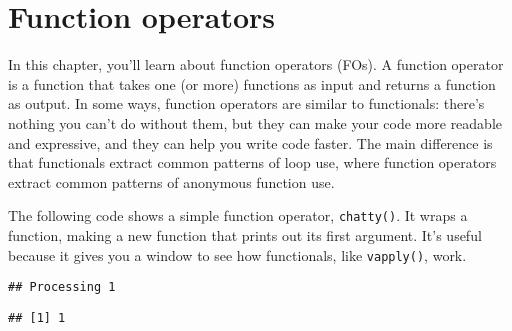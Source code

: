 \hypertarget{function-operators}{%
\chapter{Function operators}\label{function-operators}}

In this chapter, you'll learn about function operators (FOs). A function
operator is a function that takes one (or more) functions as input and
returns a function as output. In some ways, function operators are
similar to functionals: there's nothing you can't do without them, but
they can make your code more readable and expressive, and they can help
you write code faster. The main difference is that functionals extract
common patterns of loop use, where function operators extract common
patterns of anonymous function use. 

The following code shows a simple function operator, \texttt{chatty()}.
It wraps a function, making a new function that prints out its first
argument. It's useful because it gives you a window to see how
functionals, like \texttt{vapply()}, work.

\begin{Shaded}
\begin{Highlighting}[]
\StringTok{ }
\StringTok{ }
    \NormalTok{(}\NormalTok{, } \NormalTok{)}
\NormalTok{  \}}
\NormalTok{\}}
\StringTok{ }\OperatorTok{^}\StringTok{ }
\StringTok{ }\NormalTok{(}\NormalTok{, }\NormalTok{, }\NormalTok{)}
\NormalTok{)}
\end{Highlighting}
\end{Shaded}

\begin{verbatim}
## Processing 1
\end{verbatim}

\begin{verbatim}
## [1] 1
\end{verbatim}

\begin{Shaded}
\begin{Highlighting}[]
\NormalTok{(}\NormalTok{))}
\end{Highlighting}
\end{Shaded}

